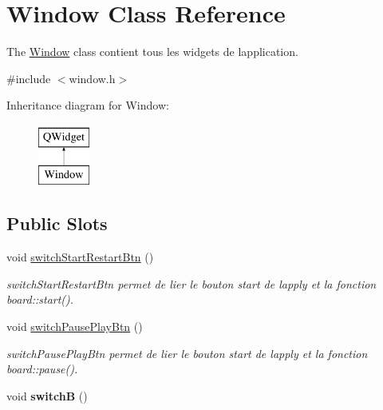 \hypertarget{class_window}{}\section{Window Class Reference}
\label{class_window}


The \hyperlink{class_window}{Window} class contient tous les widgets de l\textquotesingle{}application.  




{\ttfamily \#include $<$window.\+h$>$}

Inheritance diagram for Window\+:\begin{figure}[H]
\begin{center}
\leavevmode
\includegraphics[height=2.000000cm]{class_window}
\end{center}
\end{figure}
\subsection*{Public Slots}
\begin{DoxyCompactItemize}
\item 
void \hyperlink{class_window_a5cddf5e150455180e95f8419a52dd380}{switch\+Start\+Restart\+Btn} ()\hypertarget{class_window_a5cddf5e150455180e95f8419a52dd380}{}\label{class_window_a5cddf5e150455180e95f8419a52dd380}

\begin{DoxyCompactList}\small\item\em switch\+Start\+Restart\+Btn permet de lier le bouton start de l\textquotesingle{}apply et la fonction board\+::start(). \end{DoxyCompactList}\item 
void \hyperlink{class_window_ad57b8f4814d9dba8bb23d60ca256f328}{switch\+Pause\+Play\+Btn} ()\hypertarget{class_window_ad57b8f4814d9dba8bb23d60ca256f328}{}\label{class_window_ad57b8f4814d9dba8bb23d60ca256f328}

\begin{DoxyCompactList}\small\item\em switch\+Pause\+Play\+Btn permet de lier le bouton start de l\textquotesingle{}apply et la fonction board\+::pause(). \end{DoxyCompactList}\item 
void {\bfseries switchB} ()\hypertarget{class_window_a5d60708e4577aff4fa1c932971963b06}{}\label{class_window_a5d60708e4577aff4fa1c932971963b06}

\end{DoxyCompactItemize}
